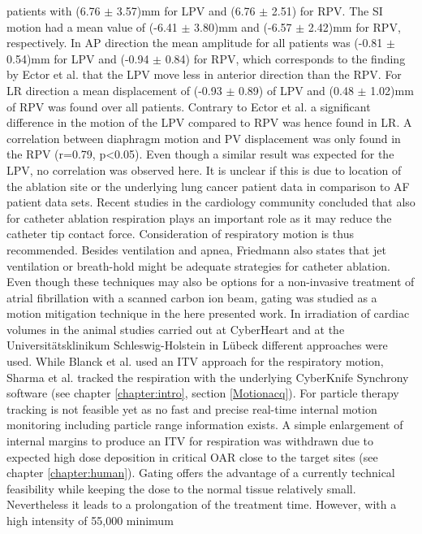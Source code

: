 \documentclass[type=dr, dr=rernat, accentcolor=tud7b,colorbacktitle, bigchapter, openright, twoside, 12pt ]{tudthesis}
\begin{document}
patients with (6.76 $\pm$ 3.57)mm for LPV and (6.76 $\pm$ 2.51) for RPV. The SI motion had a mean value of (-6.41 $\pm$ 3.80)mm and 
(-6.57 $\pm$ 2.42)mm for RPV, respectively. In AP direction the mean amplitude for all patients was (-0.81 $\pm$ 0.54)mm for LPV and 
(-0.94 $\pm$ 0.84) for RPV, which corresponds to the finding by Ector et al. that the LPV move less in anterior direction than the RPV. For LR 
direction a mean displacement of (-0.93 $\pm$ 0.89) of LPV and (0.48 $\pm$ 1.02)mm of RPV was found over all patients. 
Contrary to Ector et al. a significant difference in the motion of the LPV compared to RPV was hence found in LR. 
A correlation between diaphragm motion and PV displacement was only found in the RPV (r=0.79, p<0.05). Even though a similar result was 
expected for the LPV, no correlation was observed here. It is unclear if this is due to location of the ablation site or the 
underlying lung cancer patient data in comparison to AF patient data sets.\newline
\newline
Recent studies in the cardiology community \cite{Kum12} concluded that also for catheter ablation respiration plays an important role as it may 
reduce the catheter tip contact force. Consideration of respiratory motion is thus recommended. Besides ventilation and apnea, Friedmann 
\cite{Frie12} also states that jet ventilation or breath-hold might be adequate strategies for catheter ablation. Even though these techniques 
may also be options for a non-invasive treatment of atrial fibrillation with a scanned carbon ion beam, gating was 
studied as a motion mitigation technique in the here presented work. In irradiation of cardiac volumes in the animal studies carried out 
at CyberHeart and at the Universit\"atsklinikum Schleswig-Holstein in L\"ubeck different approaches were used. While Blanck et al. 
\cite{Bla13} used an ITV approach for the respiratory motion, Sharma et al. \cite{Sha10} tracked the respiration with the underlying 
CyberKnife Synchrony software (see chapter \ref{chapter:intro}, section \ref{Motionacq}). For particle therapy tracking is not feasible yet as 
no fast and precise real-time internal motion monitoring including particle range information exists. A simple enlargement of internal margins 
to produce an ITV for respiration was withdrawn due to expected high dose deposition in critical OAR close to the target sites 
(see chapter \ref{chapter:human}). Gating offers the advantage of a currently technical feasibility while keeping the dose to the normal 
tissue relatively small. Nevertheless it leads to a prolongation of the treatment time. However, with a high intensity of 55,000 minimum 
\end{document}
